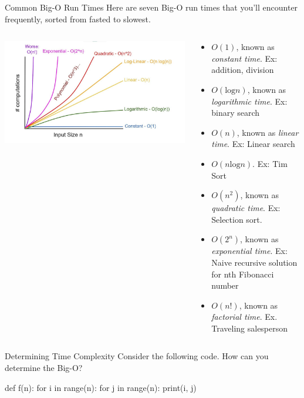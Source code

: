 \documentclass[
  ignorenonframetext,
]{beamer}
\newenvironment{Shaded}{\begin{snugshade}}{\end{snugshade}}
\newcommand{\BuiltInTok}[1]{\textcolor[rgb]{0.00,0.23,0.31}{#1}}
\newcommand{\ControlFlowTok}[1]{\textcolor[rgb]{0.00,0.23,0.31}{#1}}
\newcommand{\KeywordTok}[1]{\textcolor[rgb]{0.00,0.23,0.31}{#1}}
\newcommand{\NormalTok}[1]{\textcolor[rgb]{0.00,0.23,0.31}{#1}}
\begin{document}
\begin{frame}{Common Big-O Run Times}
\protect\hypertarget{common-big-o-run-times}{}
Here are seven Big-O run times that you'll encounter frequently, sorted
from fasted to slowest.

\begin{columns}[T]
\begin{column}{0.4\textwidth}
\includegraphics{images/big-o-viz.jpg}
\end{column}

\begin{column}{0.6\textwidth}
\begin{itemize}
\item
  \(O(1)\), known as \emph{constant time}. Ex: addition, division
\item
  \(O(\text{log}n)\), known as \emph{logarithmic time}. Ex: binary
  search
\item
  \(O(n)\), known as \emph{linear time}. Ex: Linear search
\item
  \(O(n\text{log}n)\). Ex: Tim Sort
\item
  \(O(n^2)\), known as \emph{quadratic time}. Ex: Selection sort.
\item
  \(O(2^n)\), known as \emph{exponential time}. Ex: Naive recursive
  solution for nth Fibonacci number
\item
  \(O(n!)\), known as \emph{factorial time}. Ex. Traveling salesperson
\end{itemize}
\end{column}
\end{columns}
\end{frame}

\begin{frame}[fragile]{Determining Time Complexity}
\protect\hypertarget{determining-time-complexity}{}
Consider the following code. How can you determine the Big-O?

\begin{Shaded}
\begin{Highlighting}[]
\KeywordTok{def}\NormalTok{ f(n):}
  \ControlFlowTok{for}\NormalTok{ i }\KeywordTok{in} \BuiltInTok{range}\NormalTok{(n):}
    \ControlFlowTok{for}\NormalTok{ j }\KeywordTok{in} \BuiltInTok{range}\NormalTok{(n):}
      \BuiltInTok{print}\NormalTok{(i, j)}
\end{Highlighting}
\end{Shaded}
\end{frame}
\end{document}
